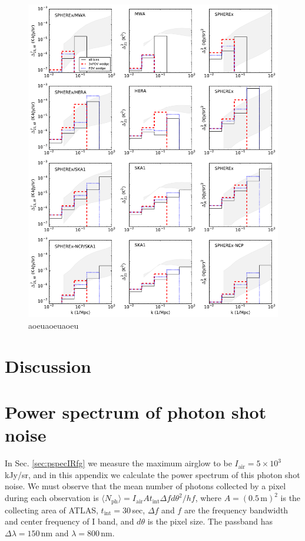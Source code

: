 \documentclass[preprint]{aastex}
\begin{document}
\begin{figure}[h]
\centering
\includegraphics[width=7in]{images/cross_and_auto_sensitivity_for_diff_expts.pdf}
\caption{aoeuaoeuaoeu}
\label{fig:corgrid}
\end{figure}






\section{Discussion}

\appendix

\section{Power spectrum of photon shot noise}
\label{sec:Pshot}

In Sec. \ref{sec:pspecIRfg} we measure the maximum airglow to be $I_\text{air}=5\times10^3$ kJy/sr, and in this appendix we calculate the power spectrum of this photon shot noise. We must observe that the mean number of photons collected by a pixel during each observation is $\langle N_\text{ph}\rangle=I_\text{air}At_\text{int} \Delta f d\theta^2/hf$, where $A=(0.5\,\text{m})^2$ is the collecting area of ATLAS, $t_\text{int}=30\,$sec, $\Delta f$ and $f$ are the frequency bandwidth and center frequency of I band, and $d\theta$ is the pixel size. The passband has $\Delta\lambda=150\,$nm and $\lambda=800\,$nm. 
\end{document}

